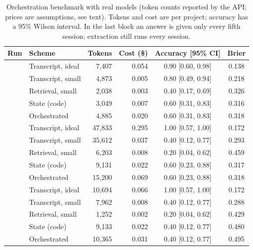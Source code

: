 \documentclass[11pt]{article}
\theoremstyle{definition}
\theoremstyle{remark}
\begin{document}
\begin{table}[t]
\centering
\caption{Orchestration benchmark with real models (token counts reported by the API; prices are assumptions, see text). Tokens and cost are per project; accuracy has a 95\% Wilson interval. In the last block an answer is given only every fifth session; extraction still runs every session.}
\label{tab:orch}
\small
\begin{tabular}{llrrcc}
\toprule
Run & Scheme & Tokens & Cost (\$) & Accuracy [95\% CI] & Brier\\
\midrule
{}
 & Transcript, ideal & 7{,}407 & 0.054 & 0.90 [0.60, 0.98] & 0.138\\
 & Transcript, small & 4{,}873 & 0.005 & 0.80 [0.49, 0.94] & 0.218\\
 & Retrieval, small & 2{,}038 & 0.003 & 0.40 [0.17, 0.69] & 0.326\\
 & State (code) & 3{,}049 & 0.007 & 0.60 [0.31, 0.83] & 0.316\\
 & Orchestrated & 4{,}885 & 0.020 & 0.60 [0.31, 0.83] & 0.318\\
\midrule
{}
 & Transcript, ideal & 47{,}833 & 0.295 & 1.00 [0.57, 1.00] & 0.172\\
 & Transcript, small & 35{,}612 & 0.037 & 0.40 [0.12, 0.77] & 0.293\\
 & Retrieval, small & 6{,}203 & 0.008 & 0.20 [0.04, 0.62] & 0.459\\
 & State (code) & 9{,}131 & 0.022 & 0.60 [0.23, 0.88] & 0.317\\
 & Orchestrated & 15{,}200 & 0.069 & 0.60 [0.23, 0.88] & 0.318\\
\midrule
{}
 & Transcript, ideal & 10{,}694 & 0.066 & 1.00 [0.57, 1.00] & 0.172\\
 & Transcript, small & 7{,}962 & 0.008 & 0.40 [0.12, 0.77] & 0.288\\
 & Retrieval, small & 1{,}252 & 0.002 & 0.20 [0.04, 0.62] & 0.429\\
 & State (code) & 9{,}133 & 0.022 & 0.40 [0.12, 0.77] & 0.480\\
 & Orchestrated & 10{,}365 & 0.031 & 0.40 [0.12, 0.77] & 0.495\\
\bottomrule
\end{tabular}
\end{table}
\end{document}
